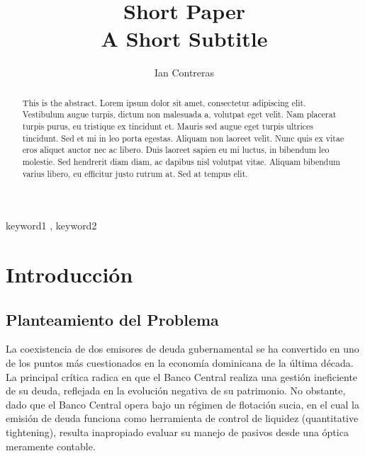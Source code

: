 \documentclass[
  authoryear,
  preprint]{elsarticle}
\renewcommand*\contentsname{Tabla de contenidos}
\newcommand\contentsname{Tabla de contenidos}
\begin{document}
\begin{frontmatter}
\title{Short Paper \\\large{A Short Subtitle} }
\author[1]{Ian Contreras%
%
}



        
\begin{abstract}
This is the abstract. Lorem ipsum dolor sit amet, consectetur adipiscing
elit. Vestibulum augue turpis, dictum non malesuada a, volutpat eget
velit. Nam placerat turpis purus, eu tristique ex tincidunt et. Mauris
sed augue eget turpis ultrices tincidunt. Sed et mi in leo porta
egestas. Aliquam non laoreet velit. Nunc quis ex vitae eros aliquet
auctor nec ac libero. Duis laoreet sapien eu mi luctus, in bibendum leo
molestie. Sed hendrerit diam diam, ac dapibus nisl volutpat vitae.
Aliquam bibendum varius libero, eu efficitur justo rutrum at. Sed at
tempus elit.
\end{abstract}





\begin{keyword}
    keyword1 \sep 
    keyword2
\end{keyword}
\end{frontmatter}
    
\renewcommand*\contentsname{Tabla de contenidos}
{
\hypersetup{linkcolor=}
\setcounter{tocdepth}{3}
\tableofcontents
}

\section{Introducción}\label{introducciuxf3n}

\subsection{Planteamiento del
Problema}\label{planteamiento-del-problema}

La coexistencia de dos emisores de deuda gubernamental se ha convertido
en uno de los puntos más cuestionados en la economía dominicana de la
última década. La principal crítica radica en que el Banco Central
realiza una gestión ineficiente de su deuda, reflejada en la evolución
negativa de su patrimonio. No obstante, dado que el Banco Central opera
bajo un régimen de flotación sucia, en el cual la emisión de deuda
funciona como herramienta de control de liquidez (quantitative
tightening), resulta inapropiado evaluar su manejo de pasivos desde una
óptica meramente contable.
\end{document}

